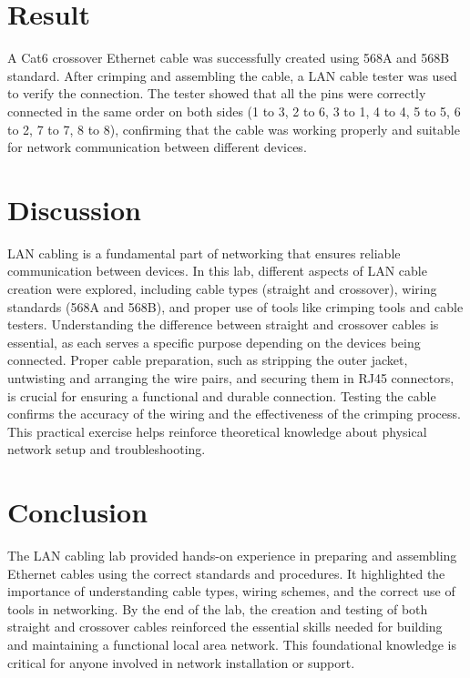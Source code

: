 \documentclass[a4paper,12pt]{report}
\begin{document}
\section*{Result}
A Cat6 crossover Ethernet cable was successfully created using 568A and 568B standard. After crimping and assembling the cable, a LAN cable tester was used to verify the connection. The tester showed that all the pins were correctly connected in the same order on both sides (1 to 3, 2 to 6, 3 to 1, 4 to 4, 5 to 5, 6 to 2, 7 to 7, 8 to 8), confirming that the cable was working properly and suitable for network communication between different devices.
\section*{Discussion}
LAN cabling is a fundamental part of networking that ensures reliable communication between devices. In this lab, different aspects of LAN cable creation were explored, including cable types (straight and crossover), wiring standards (568A and 568B), and proper use of tools like crimping tools and cable testers. Understanding the difference between straight and crossover cables is essential, as each serves a specific purpose depending on the devices being connected. Proper cable preparation, such as stripping the outer jacket, untwisting and arranging the wire pairs, and securing them in RJ45 connectors, is crucial for ensuring a functional and durable connection. Testing the cable confirms the accuracy of the wiring and the effectiveness of the crimping process. This practical exercise helps reinforce theoretical knowledge about physical network setup and troubleshooting.
\section*{Conclusion}
The LAN cabling lab provided hands-on experience in preparing and assembling Ethernet cables using the correct standards and procedures. It highlighted the importance of understanding cable types, wiring schemes, and the correct use of tools in networking. By the end of the lab, the creation and testing of both straight and crossover cables reinforced the essential skills needed for building and maintaining a functional local area network. This foundational knowledge is critical for anyone involved in network installation or support.
\end{document}
